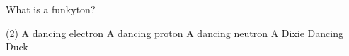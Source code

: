 \documentclass[12pt,a4paper]{article}
\begin{document}
\begin{question}{1}
    What is a funkyton?
    \begin{tasks}(2)
        \task A dancing electron
        \task A dancing proton
        \task A dancing neutron
        \task A Dixie Dancing Duck
    \end{tasks}
\end{question}

\pagebreak
\medskip
\printbibliography[
    heading=bibintoc,
    title={Referências Bibliográficas}
]
\end{document}
